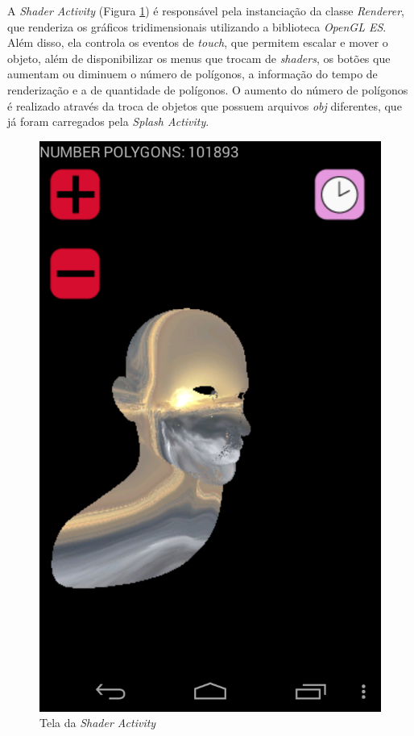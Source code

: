 	A \textit{Shader Activity} (Figura  \ref{shader_act}) é responsável pela  instanciação da classe \textit{Renderer}, que renderiza os gráficos tridimensionais utilizando a biblioteca \textit{OpenGL ES}. Além disso, ela controla os eventos de \textit{touch}, que permitem escalar e mover o objeto, além de disponibilizar os menus que trocam de \textit{shaders}, os botões que aumentam ou diminuem o número de polígonos, a informação do tempo de renderização e a de quantidade de polígonos. O aumento do número de polígonos é realizado através da troca de objetos que possuem arquivos \textit{obj} diferentes, que já foram carregados pela \textit{Splash Activity}. 

	\begin{figure}[ht]
	\centering
		\includegraphics[keepaspectratio=true,scale=0.2]{figuras/shader_act.png}
	\caption{Tela da \textit{Shader Activity}}
	\label{shader_act}
	\end{figure}

